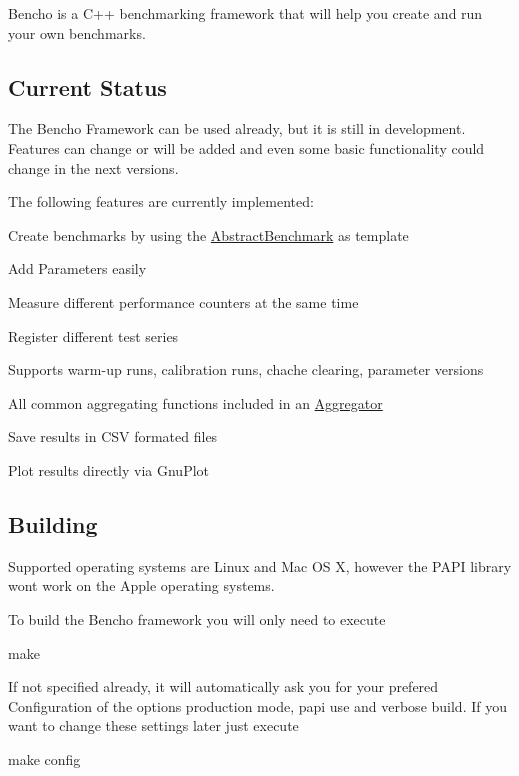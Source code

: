 Bencho is a C++ benchmarking framework that will help you create and run your own benchmarks.

\subsection*{Current Status}

The Bencho Framework can be used already, but it is still in development. Features can change or will be added and even some basic functionality could change in the next versions.

The following features are currently implemented\-:


\begin{DoxyItemize}
\item Create benchmarks by using the \hyperlink{classAbstractBenchmark}{Abstract\-Benchmark} as template
\item Add Parameters easily
\item Measure different performance counters at the same time
\item Register different test series
\item Supports warm-\/up runs, calibration runs, chache clearing, parameter versions
\item All common aggregating functions included in an \hyperlink{classAggregator}{Aggregator}
\item Save results in C\-S\-V formated files
\item Plot results directly via Gnu\-Plot
\end{DoxyItemize}

\subsection*{Building}

Supported operating systems are Linux and Mac O\-S X, however the P\-A\-P\-I library wont work on the Apple operating systems.

To build the Bencho framework you will only need to execute \begin{DoxyVerb}make
\end{DoxyVerb}


If not specified already, it will automatically ask you for your prefered Configuration of the options production mode, papi use and verbose build. If you want to change these settings later just execute \begin{DoxyVerb}make config
\end{DoxyVerb}


